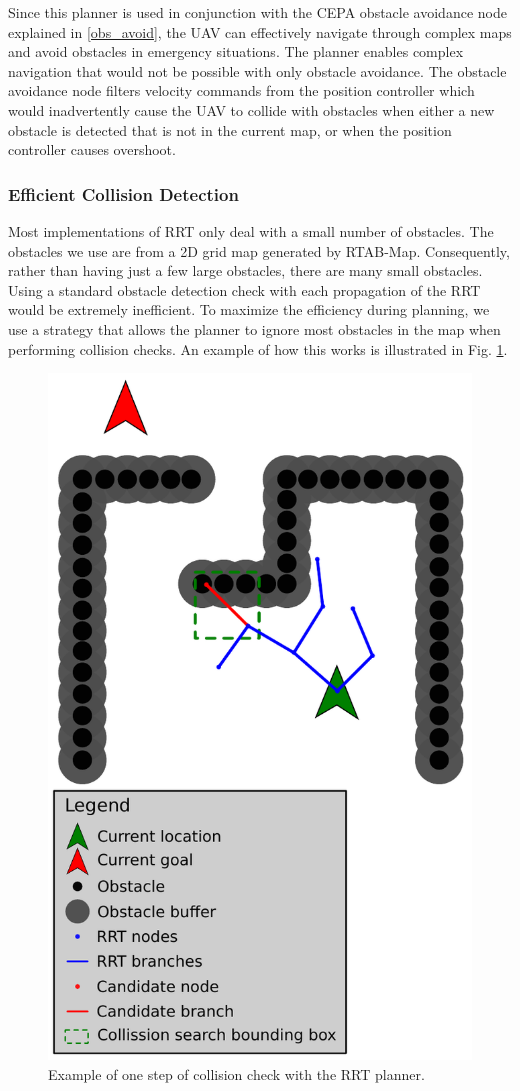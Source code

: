\documentclass[letterpaper, 10 pt, conference]{ieeeconf}  %
\begin{document}
Since this planner is used in conjunction with the CEPA obstacle avoidance node explained in \ref{obs_avoid}, the UAV can effectively navigate through complex maps and avoid obstacles in emergency situations. The planner enables complex navigation that would not be possible with only obstacle avoidance. The obstacle avoidance node filters velocity commands from the position controller which would inadvertently cause the UAV to collide with obstacles when either a new obstacle is detected that is not in the current map, or when the position controller causes overshoot.

\subsubsection{Efficient Collision Detection}
Most implementations of RRT only deal with a small number of obstacles. The obstacles we use are from a 2D grid map generated by RTAB-Map. Consequently, rather than having just a few large obstacles, there are many small obstacles. Using a standard obstacle detection check with each propagation of the RRT would be extremely inefficient. To maximize the efficiency during planning, we use a strategy that allows the planner to ignore most obstacles in the map when performing collision checks. An example of how this works is illustrated in Fig. \ref{fig:rrt_sample}.

\begin{figure}
\centering
\includegraphics[width=0.8\linewidth]{rrt_sample}
\caption{Example of one step of collision check with the RRT planner.}
\label{fig:rrt_sample}
\end{figure}
\end{document}
